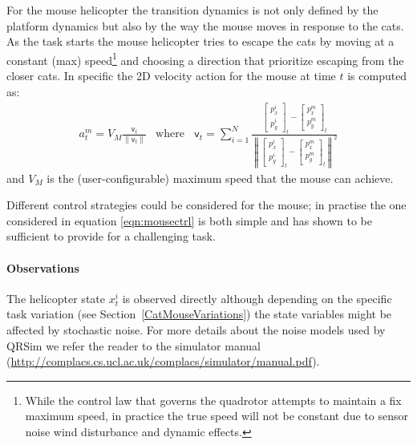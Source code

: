 \documentclass[a4paper,11pt]{report}
\newcommand{\sname}{QRSim\xspace}
\newcommand{\webman}{\url{http://complacs.cs.ucl.ac.uk/complacs/simulator/manual.pdf}\xspace}
\begin{document}
For the mouse helicopter the transition dynamics is 
not only defined by the platform dynamics but also by the way the mouse moves in response to the cats. 
 As the task starts the mouse helicopter tries to escape the cats by moving at a constant (max) speed\footnote{While the control law that governs the quadrotor attempts to maintain a fix maximum speed, in practice the true speed will not be constant due to sensor noise wind disturbance and dynamic effects.} and choosing a direction that prioritize escaping from the closer cats.
In specific the 2D velocity action for the mouse at time $t$ is computed as:
\begin{equation}\label{eqn:mousectrl}
\begin{array}{ll}
a^m_t = V_{M} \frac{\mathsf{v}_t}{\| \mathsf{v}_t \|} &
\text{where } \;\;\mathsf{v}_t = \sum_{i=1}^N \frac{\left[\begin{array}{c} p^i_x \\ p^i_y \end{array}\right]_t - \left[\begin{array}{c} p^m_x \\ p^m_y \end{array}\right]_t}{\left\| \left[\begin{array}{c} p^i_x \\ p^i_y \end{array}\right]_t - \left[\begin{array}{c} p^m_x \\ p^m_y \end{array}\right]_t \right\|^2}
\end{array}
\end{equation}
and $V_{M}$ is the (user-configurable) maximum speed that the mouse can achieve. 

Different control strategies could be considered for the mouse; in practise the one considered in equation \ref{eqn:mousectrl} is both simple and has shown to be sufficient to provide for a challenging task.

\paragraph{Observations}
The helicopter state $x^i_t$ is observed directly although depending on the specific task variation (see Section~\ref{CatMouseVariations}) the state variables might be affected by stochastic noise.
For more details about the noise models used by \sname we refer the reader to the simulator manual (\webman). 
\end{document}
